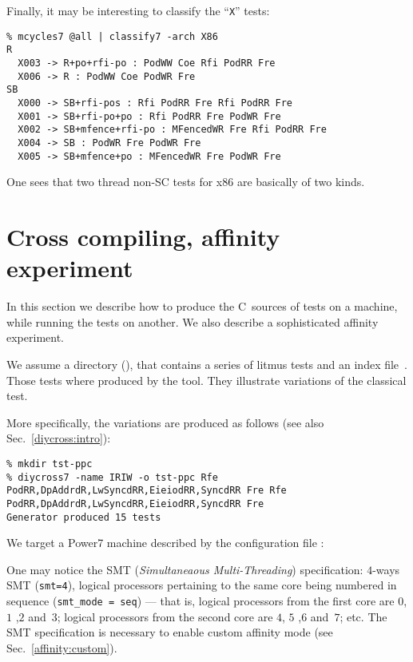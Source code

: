 Finally, it may be interesting to classify the ``\texttt{X}'' tests:
\begin{verbatim}
% mcycles7 @all | classify7 -arch X86
R
  X003 -> R+po+rfi-po : PodWW Coe Rfi PodRR Fre
  X006 -> R : PodWW Coe PodWR Fre
SB
  X000 -> SB+rfi-pos : Rfi PodRR Fre Rfi PodRR Fre
  X001 -> SB+rfi-po+po : Rfi PodRR Fre PodWR Fre
  X002 -> SB+mfence+rfi-po : MFencedWR Fre Rfi PodRR Fre
  X004 -> SB : PodWR Fre PodWR Fre
  X005 -> SB+mfence+po : MFencedWR Fre PodWR Fre
\end{verbatim}
One sees that two thread non-SC tests for x86 are basically of two kinds.




\section{Cross compiling, \label{affinity:experiment}affinity experiment}
In this section we describe how to produce the C~sources of tests
on a machine, while running the tests on another.
We also describe a sophisticated affinity experiment.

We assume a directory %
\ifhevea{} ()\fi,
that contains a series of litmus tests
and an index file~.
Those tests where produced by the \diycross{}
tool. They illustrate variations of the
classical  test.
\ifhevea\begin{center}\end{center}\fi
More specifically, the  variations are produced as follows
(see also Sec.~\ref{diycross:intro}):
\begin{verbatim}
% mkdir tst-ppc
% diycross7 -name IRIW -o tst-ppc Rfe PodRR,DpAddrdR,LwSyncdRR,EieiodRR,SyncdRR Fre Rfe PodRR,DpAddrdR,LwSyncdRR,EieiodRR,SyncdRR Fre
Generator produced 15 tests
\end{verbatim}


We target a Power7 machine described by the configuration file
:

One may notice the SMT (\emph{Simultaneaous Multi-Threading}) specification:
$4$-ways SMT (\verb+smt=4+), logical processors pertaining
to the same core being numbered in sequence (\verb+smt_mode = seq+) ---
that is, logical processors from the first core are $0$, $1$ ,$2$ and~$3$;
logical processors from the second core are $4$, $5$ ,$6$ and~$7$; etc.
The SMT specification is necessary to enable
custom affinity mode
(see Sec.~\ref{affinity:custom}).

